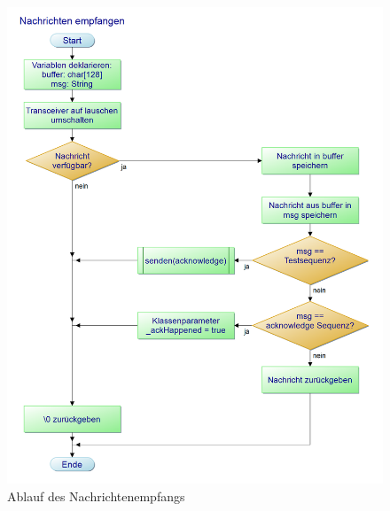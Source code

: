 \documentclass[a4paper, 11pt]{scrartcl}
\begin{document}
\begin{small}
\begin{figure}[H]
    \begin{center}
        \includegraphics[scale=0.4]{Bilder/Nachrichten_empfangen.png}
        \caption{Ablauf des Nachrichtenempfangs}\label{diag:receive_pap}
    \end{center}
\end{figure}


\end{small}
\end{document}
